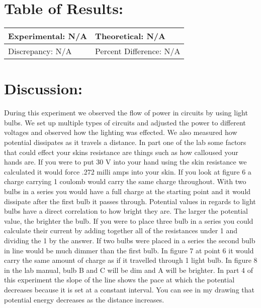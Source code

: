 \documentclass{article}
\begin{document}
\section*{Table of Results:}
\begin{center}
\begin{tabular}{|l|l|}
\hline
	Experimental: N/A & Theoretical: N/A  \\ \hline
	Discrepancy: N/A   & Percent Difference: N/A \\
\hline
\end{tabular}
\end{center}

\section*{Discussion:}
\doublespace
During this experiment we observed the flow of power in circuits by using light bulbs.  We set up multiple types of circuits and adjusted the power to different voltages and observed how the lighting was effected.  We also measured how potential dissipates as it travels a distance. In part one of the lab some factors that could effect your skins resistance are things such as how calloused your hands are.  If you were to put 30 V into your hand using the skin resistance we calculated it would force .272 milli amps into your skin.  If you look at figure 6 a charge carrying 1 coulomb would carry the same charge throughout.  With two bulbs in a series you would have a full charge at the starting point and it would dissipate after the first bulb it passes through.  Potential values in regards to light bulbs have a direct correlation to how bright they are.  The larger the potential value, the brighter the bulb.  If you were to place three bulb in a series you could calculate their current by adding together all of the resistances under 1 and dividing the 1 by the answer.  If two bulbs were placed in a series the second bulb in line would be much dimmer than the first bulb.  In figure 7 at point 6 it would carry the same amount of charge as if it travelled through 1 light bulb.  In figure 8 in the lab manual, bulb B and C will be dim and A will be brighter.  In part 4 of this experiment the slope of the line shows the pace at which the potential decreases because it is set at a constant interval.  You can see in my drawing that potential energy decreases as the distance increases.
\end{document}
